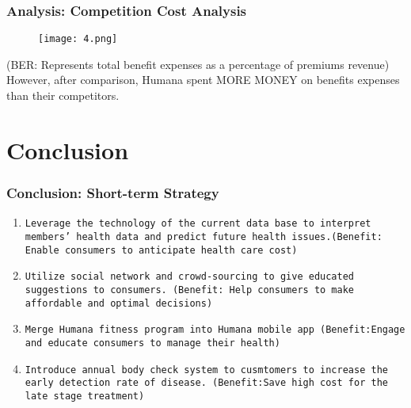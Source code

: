 \documentclass[compress,handout,10pt]{beamer}
\let\olditem\item
\renewcommand{\item}{\setlength{\itemsep}{0.5\baselineskip}\olditem}
\begin{document}
\begin{frame}[dresden]
   \frametitle{Analysis: Competition Cost Analysis}
\begin{figure}[h]
    \begin{center}
        \texttt{[image: 4.png]}
    \end{center}
    \caption{}
    \label{fig:seats}
\end{figure}
    \begin{center}
\small(BER: Represents total benefit expenses as a percentage of premiums revenue)
\newline \large However, after comparison, Humana spent MORE MONEY on benefits expenses than their competitors.
    \end{center}
\end{frame}






\section{\large Conclusion}




\begin{frame}
    \frametitle{Conclusion: Short-term Strategy}
            \begin{enumerate}
                \item \texttt{Leverage the technology of the current data base to interpret members’ health data and predict future health issues.\newline (Benefit: Enable consumers to anticipate health care cost) }    
          \item \texttt{Utilize social network and crowd-sourcing to give educated suggestions to consumers.
\newline (Benefit: Help consumers to make affordable and optimal decisions) }    
     \item \texttt{Merge Humana fitness program into Humana mobile app
\newline (Benefit:Engage and educate consumers to manage their health) }    
                \item \texttt{Introduce annual body check system to cusmtomers to increase the early detection rate of disease.
\newline (Benefit:Save high cost for the late stage treatment)} 
            \end{enumerate}
\end{frame}
\end{document}
